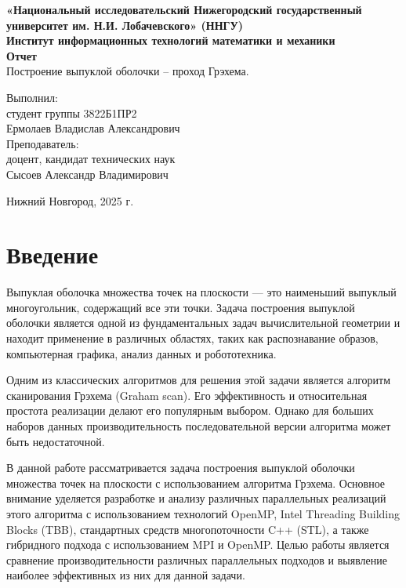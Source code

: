 \documentclass[12pt]{article}
\begin{document}
\thispagestyle{empty}
\begin{center}
    {\bfseries
    {\large «Национальный исследовательский Нижегородский государственный университет им.
Н.И. Лобачевского» (ННГУ) }\\[2em]
    {\large Институт информационных технологий математики и механики }\\[1em]
    }
    \vspace*{\fill} 
    {\LARGE\bfseries Отчет}\\[1em]
    {\large Построение выпуклой оболочки – проход Грэхема.}\\[5em]
    \vspace{\fill} 
     \hfill\parbox{0.4\textwidth}{
        Выполнил:\\
        студент группы 3822Б1ПР2\\
        Ермолаев Владислав Александрович\\[2em]
        Преподаватель:\\
        доцент, кандидат технических наук\\
        Сысоев Александр Владимирович\\[2em]
    }
    
    Нижний Новгород, 2025 г.
\end{center}
\newpage

\tableofcontents
\newpage

\section{Введение}
Выпуклая оболочка множества точек на плоскости --- это наименьший выпуклый многоугольник, содержащий все эти точки. Задача построения выпуклой оболочки является одной из фундаментальных задач вычислительной геометрии и находит применение в различных областях, таких как распознавание образов, компьютерная графика, анализ данных и робототехника.

Одним из классических алгоритмов для решения этой задачи является алгоритм сканирования Грэхема (Graham scan). Его эффективность и относительная простота реализации делают его популярным выбором. Однако для больших наборов данных производительность последовательной версии алгоритма может быть недостаточной.

В данной работе рассматривается задача построения выпуклой оболочки множества точек на плоскости с использованием алгоритма Грэхема. Основное внимание уделяется разработке и анализу различных параллельных реализаций этого алгоритма с использованием технологий OpenMP, Intel Threading Building Blocks (TBB), стандартных средств многопоточности C++ (STL), а также гибридного подхода с использованием MPI и OpenMP. Целью работы является сравнение производительности различных параллельных подходов и выявление наиболее эффективных из них для данной задачи.
\end{document}
